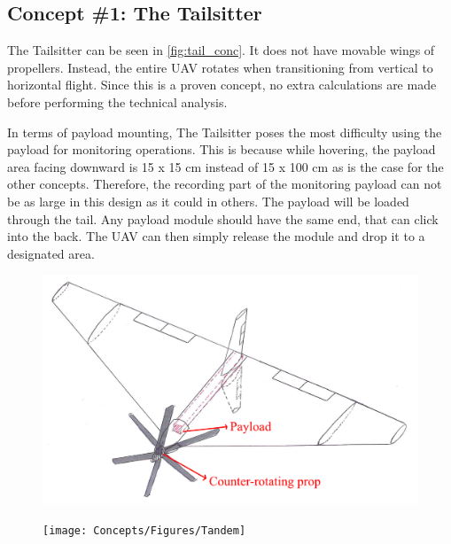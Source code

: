 \subsection{Concept \#1: The Tailsitter}
The Tailsitter can be seen in \autoref{fig:tail_conc}. It does not have movable wings of propellers. Instead, the entire UAV rotates when transitioning from vertical to horizontal flight. Since this is a proven concept\footnotemark, no extra calculations are made before performing the technical analysis. 

In terms of payload mounting, The Tailsitter poses the most difficulty using the payload for monitoring operations. This is because while hovering, the payload area facing downward is 15 x 15 cm instead of 15 x 100 cm as is the case for the other concepts. Therefore, the recording part of the monitoring payload can not be as large in this design as it could in others. The payload will be loaded through the tail. Any payload module should have the same end, that can click into the back. The UAV can then simply release the module and drop it to a designated area.



\begin{figure}[htb]
\centering
\begin{minipage}{.5\textwidth}
  \centering
  \includegraphics[width=.95\linewidth]{Concepts/Figures/Tailsitter}
  \label{fig:tail_conc}
\end{minipage}%
\begin{minipage}{.5\textwidth}
  \centering
  \texttt{[image: Concepts/Figures/Tandem]}
  \label{fig:tand_conc}
\end{minipage}
\end{figure}


